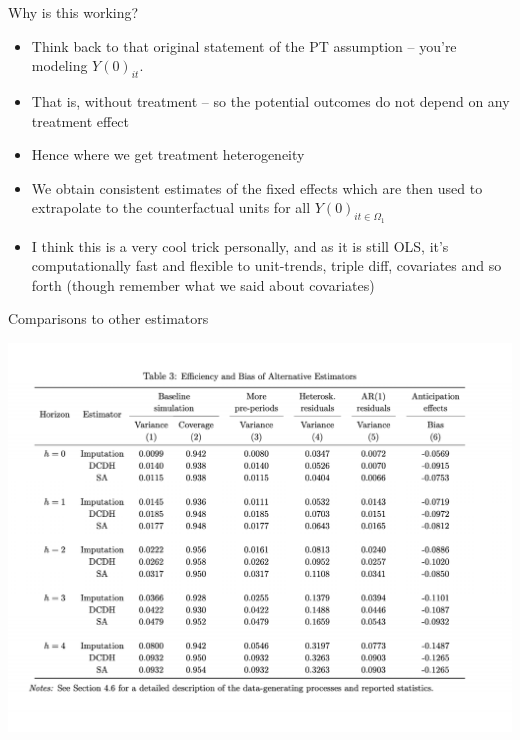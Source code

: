 \documentclass{beamer}
\begin{document}
\begin{frame}{Why is this working?}

\begin{itemize}
\item Think back to that original statement of the PT assumption -- you're modeling $Y(0)_{it}$. 
\item That is, without treatment -- so the potential outcomes do not depend on any treatment effect
\item Hence where we get treatment heterogeneity
\item We obtain consistent estimates of the fixed effects which are then used to extrapolate to the counterfactual units for all $Y(0)_{it \in \Omega_1}$
\item I think this is a very cool trick personally, and as it is still OLS, it's computationally fast and flexible to unit-trends, triple diff, covariates and so forth (though remember what we said about covariates)
\end{itemize}

\end{frame}


\begin{frame}{Comparisons to other estimators}

\begin{center}
\includegraphics[scale=0.35]{./lecture_includes/bjs_sim.pdf}
\end{center}

\end{frame}
\end{document}
